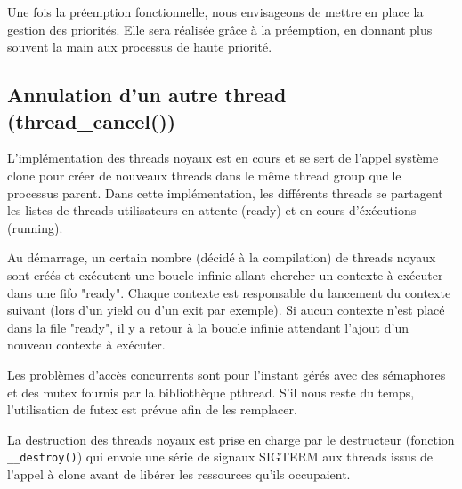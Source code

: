 Une fois la préemption fonctionnelle, nous envisageons de mettre en place la
gestion des priorités. Elle sera réalisée grâce à la préemption, en donnant
plus souvent la main aux processus de haute priorité.
 
\subsection{Annulation d'un autre thread (thread\_cancel())}
L'implémentation des threads noyaux est en cours et se sert de l'appel système clone pour créer de nouveaux threads dans le même thread group que le processus parent. Dans cette implémentation, les différents threads se partagent les listes de threads utilisateurs en attente (ready) et en cours d'éxécutions (running).

Au démarrage, un certain nombre (décidé à la compilation) de threads noyaux sont créés et exécutent une boucle infinie allant chercher un contexte à exécuter dans une fifo "ready". Chaque contexte est responsable du lancement du contexte suivant (lors d'un yield ou d'un exit par exemple). Si aucun contexte n'est placé dans la file "ready", il y a retour à la boucle infinie attendant l'ajout d'un nouveau contexte à exécuter.

Les problèmes d'accès concurrents sont pour l'instant gérés avec des sémaphores et des mutex fournis par la bibliothèque pthread. S'il nous reste du temps, l'utilisation de futex est prévue afin de les remplacer.

La destruction des threads noyaux est prise en charge par le destructeur (fonction \verb!__destroy()!) qui envoie une série de signaux SIGTERM aux threads issus de l'appel à clone avant de libérer les ressources qu'ils occupaient.
